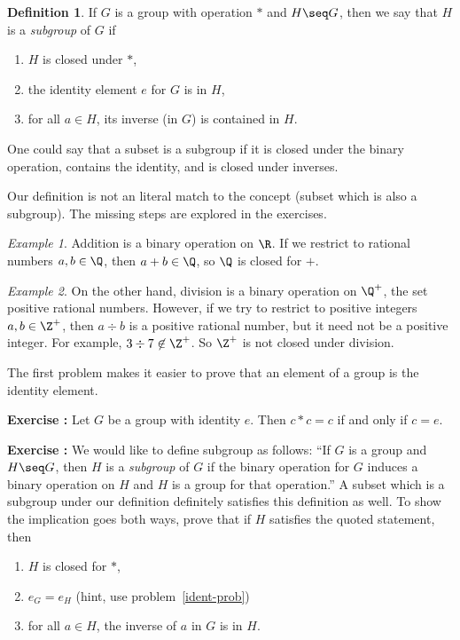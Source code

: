 \documentclass[12pt]{amsart}
\newcounter{probs}
\newenvironment{prob}{%
  \refstepcounter{probs}
  \par\medskip\noindent\textbf{Exercise \theprobs:} }{\par\medskip}
\theoremstyle{plain}
\theoremstyle{definition}
\newtheorem{defn}[thm]{Definition}
\theoremstyle{remark}
\newtheorem*{exam}{Example}
\begin{document}
\begin{defn}
  If $G$ is a group with operation $*$ and $H\seq G$, then we say that
  $H$ is a \emph{subgroup} of $G$ if
  \begin{enumerate}
  \item $H$ is closed under $*$,
  \item the identity element $e$ for $G$ is in $H$,
  \item for all $a\in H$, its inverse (in $G$) is contained in $H$.
  \end{enumerate}
\end{defn}

One could say that a subset is a subgroup if it is closed under the
binary operation, contains the identity, and is closed under
inverses.

Our definition is not an literal match to the concept (subset which is
also a subgroup).  The missing steps are explored in the exercises.

\begin{exam}
  Addition is a binary operation on $\R$.  If we restrict to rational
  numbers $a,b\in\Q$, then $a+b\in\Q$, so $\Q$ is closed for $+$.
\end{exam}
\begin{exam}
  On the other hand, division is a binary operation on $\Q^+$, the set
  positive rational numbers.  However, if we try to restrict to
  positive integers $a,b\in\Z^+$, then $a\div b$ is a positive
  rational number, but it need not be a positive integer.  For
  example, $3\div 7\not\in\Z^+$.  So $\Z^+$ is not closed under
  division.
\end{exam}

The first problem makes it easier to prove that an element of a group
is the identity element.
\begin{prob} \label{ident-prob}
Let $G$ be a group with identity $e$.  Then $c*c=c$ if and only if $c=e$.
\end{prob}

\begin{prob}
  We would like to define subgroup as follows: ``If $G$ is a group and
  $H\seq G$, then $H$ is a \emph{subgroup} of $G$ if the binary
  operation for $G$ induces a binary operation on $H$ and $H$ is a
  group for that operation.''  A subset which is a subgroup under our
  definition definitely satisfies this definition as well.  To show
  the implication goes both ways, prove that if $H$ satisfies the
  quoted statement, then
  \begin{enumerate}
  \item $H$ is closed for $*$,
  \item $e_G=e_H$ (hint, use problem~\ref{ident-prob})
  \item for all $a\in H$, the inverse of $a$ in $G$ is in $H$.
  \end{enumerate}
\end{prob}
\end{document}
